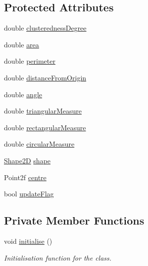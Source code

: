 \subsection*{Protected Attributes}
\begin{DoxyCompactItemize}
\item 
double \hyperlink{classmultiscale_1_1analysis_1_1SpatialCollection2D_acd11d0bbeb60a1168bd2c2fbbc6fe965}{clusteredness\-Degree}
\item 
double \hyperlink{classmultiscale_1_1analysis_1_1SpatialCollection2D_ac570cc755e52aeb9deacf12d223a4a3a}{area}
\item 
double \hyperlink{classmultiscale_1_1analysis_1_1SpatialCollection2D_ae8045702b66fd813cfff49fa86b02e68}{perimeter}
\item 
double \hyperlink{classmultiscale_1_1analysis_1_1SpatialCollection2D_ac2a5d3f8c2cb878c710d821c536b8a4f}{distance\-From\-Origin}
\item 
double \hyperlink{classmultiscale_1_1analysis_1_1SpatialCollection2D_ab452753ab21ee26732afb77a6478b3ce}{angle}
\item 
double \hyperlink{classmultiscale_1_1analysis_1_1SpatialCollection2D_a578070e91858e9e87de1e0f5771d6c3f}{triangular\-Measure}
\item 
double \hyperlink{classmultiscale_1_1analysis_1_1SpatialCollection2D_aad7d79a7bd299d4d3c08a864cfcb77c3}{rectangular\-Measure}
\item 
double \hyperlink{classmultiscale_1_1analysis_1_1SpatialCollection2D_a4c58c82dd3d67d670b554bfaeb2b19ba}{circular\-Measure}
\item 
\hyperlink{namespacemultiscale_1_1analysis_ad1ef6155ab2e954c1c33d3e2e6b53fbf}{Shape2\-D} \hyperlink{classmultiscale_1_1analysis_1_1SpatialCollection2D_a4df95ecca90ce33332a69e0aefcf73d9}{shape}
\item 
Point2f \hyperlink{classmultiscale_1_1analysis_1_1SpatialCollection2D_afe9ef6b70ff53161cb02749444ae372c}{centre}
\item 
bool \hyperlink{classmultiscale_1_1analysis_1_1SpatialCollection2D_a6d942f2856adc673e9d361596744b37f}{update\-Flag}
\end{DoxyCompactItemize}
\subsection*{Private Member Functions}
\begin{DoxyCompactItemize}
\item 
void \hyperlink{classmultiscale_1_1analysis_1_1SpatialCollection2D_ae128b71f769a10ff5bc7452e2ec9d555}{initialise} ()
\begin{DoxyCompactList}\small\item\em Initialisation function for the class. \end{DoxyCompactList}\end{DoxyCompactItemize}



